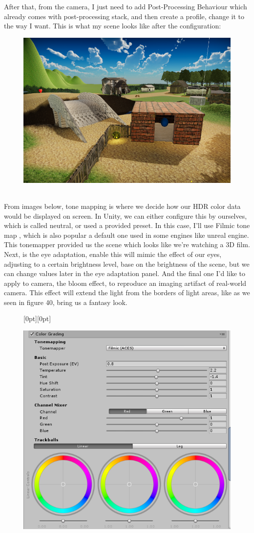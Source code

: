 \documentclass[a4paper, 13pt]{extarticle}
\begin{document}
{After that, from the camera, I just need to add Post-Processing Behaviour which already comes with post-processing stack, and then create a profile, change it to the way I want. This is what my scene looks like after the configuration:
\begin{figure}[h] 
	\begin{minipage}{1\textwidth}
		\centering
		\includegraphics[width=0.45\linewidth]{intructions/3d_film.png}
		\centering
		\label{fig:test35}
	\end{minipage}      	
\end{figure} \\
From images below, tone mapping is where we decide how our HDR color data would be displayed on screen. In Unity, we can either configure this by ourselves, which is called neutral, or used a provided preset. In this case, I'll use Filmic tone map , which is also popular a default one used in some engines like unreal engine. This tonemapper provided us the scene which looks like we're watching a 3D film. Next, is the eye adaptation, enable this will mimic the effect of our eyes, adjusting to a certain brightness level, base on the brightness of the scene, but we can change values later in the eye adaptation panel. And the final one I'd like to apply to camera, the bloom effect, to reproduce an imaging artifact of real-world camera. This effect will extend the light from the borders of light areas, like as we seen in figure 40, bring us a fantasy look.  
\begin{figure}[h] 
\raisebox{-32mm}[0pt][0pt]{
 	\begin{minipage}{0.45\textwidth}
 		\centering
 		\includegraphics[width=0.8\linewidth]{intructions/Tone_mapper.png}

\end{minipage}}
\end{figure}}
\end{document}
